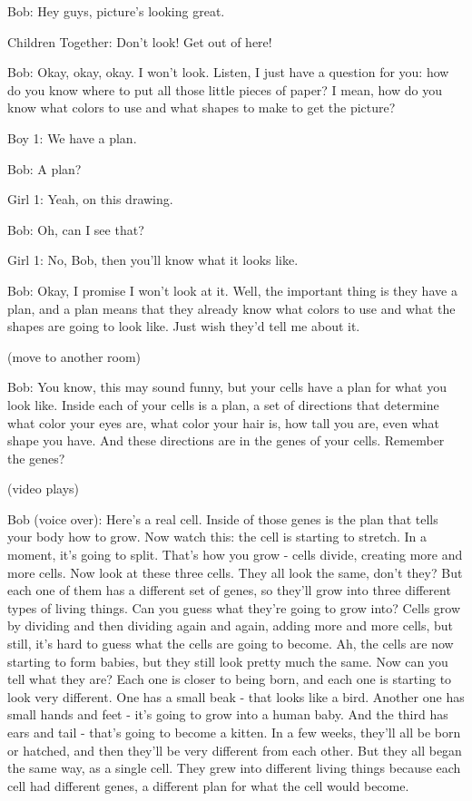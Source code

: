 Bob: Hey guys, picture's looking great.

Children Together: Don't look! Get out of here!

Bob: Okay, okay, okay. I won't look. Listen, I just have a question for you: how do you know where to put all those little pieces of paper? I mean, how do you know what colors to use and what shapes to make to get the picture?

Boy 1: We have a plan.

Bob: A plan?

Girl 1: Yeah, on this drawing.

Bob: Oh, can I see that?

Girl 1: No, Bob, then you'll know what it looks like.

Bob: Okay, I promise I won't look at it. Well, the important thing is they have a plan, and a plan means that they already know what colors to use and what the shapes are going to look like. Just wish they'd tell me about it.

(move to another room)

Bob: You know, this may sound funny, but your cells have a plan for what you look like. Inside each of your cells is a plan, a set of directions that determine what color your eyes are, what color your hair is, how tall you are, even what shape you have. And these directions are in the genes of your cells. Remember the genes?

(video plays)

Bob (voice over): Here's a real cell. Inside of those genes is the plan that tells your body how to grow. Now watch this: the cell is starting to stretch. In a moment, it's going to split. That's how you grow - cells divide, creating more and more cells. Now look at these three cells. They all look the same, don't they? But each one of them has a different set of genes, so they'll grow into three different types of living things. Can you guess what they're going to grow into? Cells grow by dividing and then dividing again and again, adding more and more cells, but still, it's hard to guess what the cells are going to become. Ah, the cells are now starting to form babies, but they still look pretty much the same. Now can you tell what they are? Each one is closer to being born, and each one is starting to look very different. One has a small beak - that looks like a bird. Another one has small hands and feet - it's going to grow into a human baby. And the third has ears and tail - that's going to become a kitten. In a few weeks, they'll all be born or hatched, and then they'll be very different from each other. But they all began the same way, as a single cell. They grew into different living things because each cell had different genes, a different plan for what the cell would become.

